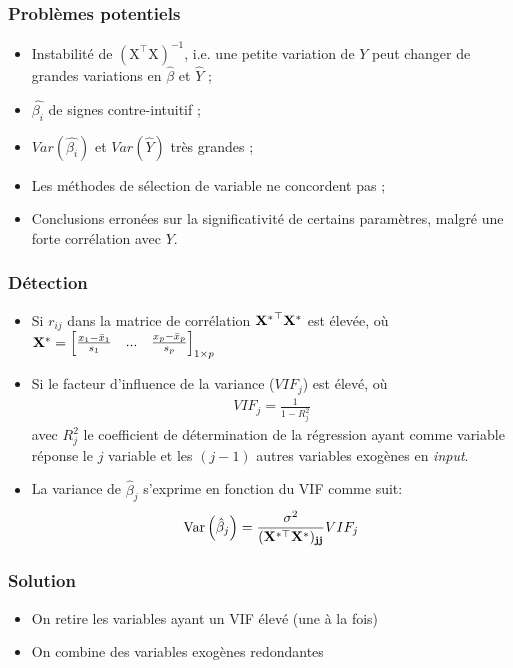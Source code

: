 \documentclass[10pt, french]{article}
\begin{document}
\begin{multicols*}{3}
\subsubsection*{Problèmes potentiels}
\begin{itemize}
\item Instabilité de $\mathrm{(X^\top X)^{-1}}$, i.e. une petite variation de $Y$ peut changer de grandes variations en $\hat{\beta}$ et $\hat{Y}$ ;
\item $\hat{\beta_i}$ de signes contre-intuitif ;
\item $Var(\hat{\beta_i})$ et $Var(\hat{Y})$ très grandes ;
\item Les méthodes de sélection de variable ne concordent pas ;
\item Conclusions erronées sur la significativité de certains paramètres, malgré une forte corrélation avec $Y$.
\end{itemize}

\subsubsection*{Détection}
\begin{itemize}
\item Si $r_{ij}$ dans la matrice de corrélation $\mathbf{{X^*}^\top X^*}$ est élevée, où $\mathbf{X^*} = \begin{bmatrix}
\frac{x_1 - \bar{x}_1}{s_1} & ... & \frac{x_p - \bar{x}_p}{s_p}
\end{bmatrix}_{1 \times p}$

\item Si le facteur d'influence de la variance ($VIF_j$) est élevé, où
\begin{align*}
VIF_j = \frac{1}{1 - R_j^2}
\end{align*}
avec $R_j^2$ le coefficient de détermination de la régression ayant comme variable réponse le $j$ variable et les $(j-1)$ autres variables exogènes en \textit{input}.
\item La variance de $\hat{\beta}_j$ s'exprime en fonction du VIF comme suit:
\begin{align*}
	\mathrm{Var} \left( \hat{\beta}_j \right) = \frac{\sigma^2}{(\mathbf{X^{*\top} \mathbf{X^*})_{jj}}} VIF_j
\end{align*}
\end{itemize}

\subsubsection*{Solution}
\begin{itemize}
	\item On retire les variables ayant un VIF élevé (une à la fois)
	\item On combine des variables exogènes redondantes	
\end{itemize}


\end{multicols*}
\end{document}
